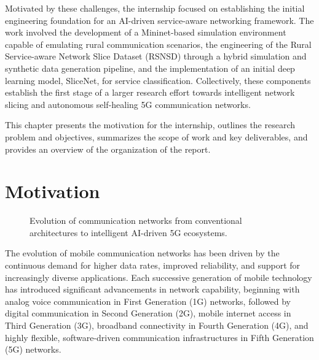 \documentclass[12pt,a4paper]{report}
\begin{document}
	Motivated by these challenges, the internship focused on establishing the initial engineering foundation for an AI-driven service-aware networking framework. The work involved the development of a Mininet-based simulation environment capable of emulating rural communication scenarios, the engineering of the Rural Service-aware Network Slice Dataset (RSNSD) through a hybrid simulation and synthetic data generation pipeline, and the implementation of an initial deep learning model, SliceNet, for service classification. Collectively, these components establish the first stage of a larger research effort towards intelligent network slicing and autonomous self-healing 5G communication networks.
	
	This chapter presents the motivation for the internship, outlines the research problem and objectives, summarizes the scope of work and key deliverables, and provides an overview of the organization of the report.
	
	
	\section{Motivation}
	\label{sec:motivation}
	
	
	\begin{figure}[H]
		\centering
		\fbox{\rule{0pt}{2.5in}\rule{0.9\textwidth}{0pt}}
		\caption{Evolution of communication networks from conventional architectures
			to intelligent AI-driven 5G ecosystems.}
		\label{fig:network_evolution}
	\end{figure}
	
	The evolution of mobile communication networks has been driven by the continuous demand for higher data rates, improved reliability, and support for increasingly diverse applications. Each successive generation of mobile technology has introduced significant advancements in network capability, beginning with analog voice communication in First Generation (1G) networks, followed by digital communication in Second Generation (2G), mobile internet access in Third Generation (3G), broadband connectivity in Fourth Generation (4G), and highly flexible, software-driven communication infrastructures in Fifth Generation (5G) networks.
	
\end{document}
